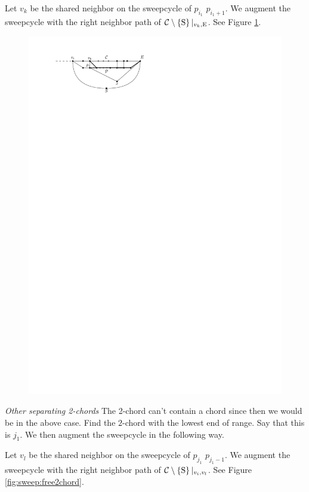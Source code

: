     Let $v_k$ be the shared neighbor on the sweepcycle of $p_{i_1}$ $p_{i_1 +1}$. We augment the sweepcycle with the right neighbor path of $\mathcal{C} \setminus \left\lbrace {\mathrm{S}} \right\rbrace|_{v_k, \mathrm{E}}$. See Figure \ref{fig:sweep:pEBound}.

    \begin{figure}[h]
      \centering
      \includegraphics[scale=1]{unifiedAlgo/img/pEBound}
      \caption{}
      \label{fig:sweep:pEBound}
    \end{figure}
    \emph{Other separating 2-chords}
    The 2-chord can't contain a chord since then we would be in the above case.
    Find the $2$-chord with the lowest end of range. Say that this is $j_1$. We then augment the sweepcycle in the following way.

    Let $v_l$ be the shared neighbor on the sweepcycle of $p_{j_1}$ $p_{j_1 -1}$. We augment the sweepcycle with the right neighbor path of $\mathcal{C} \setminus \left\lbrace {\mathrm{S}} \right\rbrace|_{v_i, v_l}$. See Figure \ref{fig:sweep:free2chord}.

